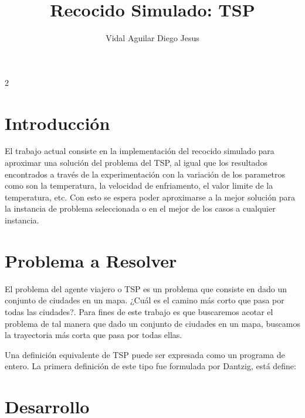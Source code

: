 

\author{Vidal Aguilar Diego Jesus}
\title{Recocido Simulado: TSP}


\titulo

\begin{multicols}{2}



\section{Introducción}

El trabajo actual consiste en la implementación del recocido simulado para aproximar una solución del problema del TSP, al igual que los resultados encontrados a través de la experimentación con la variación de los parametros como son la temperatura, la velocidad de enfriamento, el valor limite de la temperatura, etc. Con esto se espera poder aproximarse a la mejor solución para la instancia de problema seleccionada o en el mejor de los casos a cualquier instancia.

\section{Problema a Resolver}

El problema del agente viajero o TSP es un problema que consiste en dado un conjunto de ciudades en un mapa. ¿Cuál es el camino más corto que pasa por todas las ciudades?. Para fines de este trabajo es que buscaremos acotar el problema de tal manera que dado un conjunto de ciudades en un mapa, buscamos la trayectoria más corta que pasa por todas ellas.

Una definición equivalente de TSP puede ser expresada como un programa de entero. La primera definición de este tipo fue formulada por Dantzig, está define:

\section{Desarrollo}


\end{multicols}
